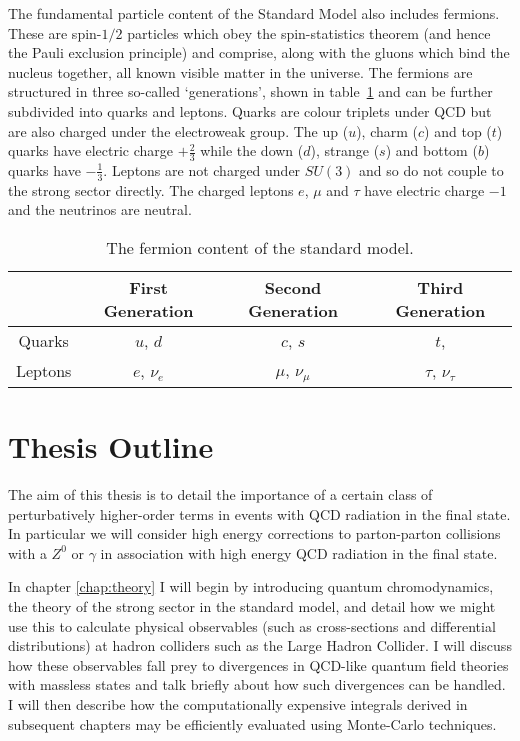 	The fundamental particle content of the Standard Model also includes fermions. These are spin-$1/2$
	particles which obey the spin-statistics theorem (and hence the Pauli exclusion principle) and
	comprise, along with the gluons which bind the nucleus together, all known visible matter in the
	universe. The fermions are structured in three so-called `generations', shown in table~\ref{tab:fermions}
	and can be further subdivided into quarks and leptons. Quarks are colour triplets under QCD but are
	also charged under the electroweak group.  The up ($u$), charm ($c$) and top ($t$) quarks have electric
	charge $+\frac{2}{3}$ while the down ($d$), strange ($s$) and bottom ($b$) quarks have $-\frac{1}{3}$.
	Leptons are not charged under $SU(3)$ and so do not couple to the strong sector directly.  The charged leptons
	$e$, $\mu$ and $\tau$ have electric charge $-1$ and the neutrinos are neutral.

	\begin{table}[hbt!]
	\begin{center}
	\begin{tabular}{c | c | c | c}
	        & First Generation & Second Generation & Third Generation   \\ \hline
	Quarks  &  $u$, $d$        & $c$, $s$          & $t$,               \\ \hline
	Leptons &  $e$, $\nu_e$    & $\mu$, $\nu_\mu$  & $\tau$, $\nu_\tau$ \\
	\end{tabular}
	\caption{The fermion content of the standard model.}
	\label{tab:fermions}
	\end{center}
	\end{table}

\section{Thesis Outline}
	\label{sec:outline}

	The aim of this thesis is to detail the importance of a certain class of perturbatively higher-order terms
	in events with QCD radiation in the final state.  In particular we will consider high energy corrections to parton-parton
	collisions with a $Z^0$ or $\gamma$ in association with high energy QCD radiation in the final state.

	In chapter \ref{chap:theory} I will begin by introducing quantum chromodynamics, the theory of the strong
	sector in the standard model, and detail how we might use this to calculate physical observables (such as
	cross-sections and differential distributions) at hadron colliders such as the Large Hadron Collider.  I
	will discuss how these observables fall prey to divergences in QCD-like quantum field theories with massless
	states and talk briefly about how such divergences can be handled.  I will then describe how the computationally
	expensive integrals derived in subsequent chapters may be efficiently evaluated using Monte-Carlo techniques.

